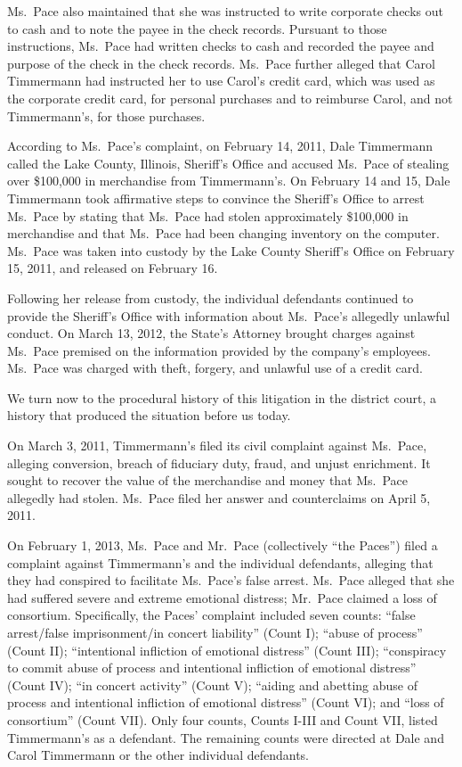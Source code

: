 \documentclass[11pt,letterpaper,twoside]{article}
\begin{document}
Ms.~Pace also maintained that she was instructed to write corporate
checks out to cash and to note the payee in the check records. Pursuant
to those instructions, Ms.~Pace had written checks to cash and recorded
the payee and purpose of the check in the check records. Ms.~Pace
further alleged that Carol Timmermann had instructed her to use Carol's
credit card, which was used as the corporate credit card, for personal
purchases and to reimburse Carol, and not Timmermann's, for those
purchases.

According to Ms.~Pace's complaint, on February 14, 2011, Dale Timmermann
called the Lake County, Illinois, Sheriff's Office and accused Ms.~Pace
of stealing over \$100,000 in merchandise from Timmermann's. On February
14 and 15, Dale Timmermann took affirmative steps to convince the
Sheriff's Office to arrest Ms.~Pace by stating that Ms.~Pace had stolen
approximately \$100,000 in merchandise and that Ms.~Pace had been
changing inventory on the computer. Ms.~Pace was taken into custody by
the Lake County Sheriff's Office on February 15, 2011, and released on
February 16.

Following her release from custody, the individual defendants continued
to provide the Sheriff's Office with information about Ms.~Pace's
allegedly unlawful conduct. On March 13, 2012, the State's Attorney
brought charges against Ms.~Pace premised on the information provided by
the company's employees. Ms.~Pace was charged with theft, forgery, and
unlawful use of a credit card.

We turn now to the procedural history of this litigation in the district
court, a history that produced the situation before us today.

On March 3, 2011, Timmermann's filed its civil complaint against
Ms.~Pace, alleging conversion, breach of fiduciary duty, fraud, and
unjust enrichment. It sought to recover the value of the merchandise and
money that Ms.~Pace allegedly had stolen. Ms.~Pace filed her answer and
counterclaims on April 5, 2011.

On February 1, 2013, Ms.~Pace and Mr.~Pace (collectively ``the Paces'')
filed a complaint against Timmermann's and the individual defendants,
alleging that they had conspired to facilitate Ms.~Pace's false arrest.
Ms.~Pace alleged that she had suffered severe and extreme emotional
distress; Mr.~Pace claimed a loss of consortium. Specifically, the
Paces' complaint included seven counts: ``false arrest/false
imprisonment/in concert liability'' (Count I); ``abuse of process''
(Count II); ``intentional infliction of emotional distress'' (Count
III); ``conspiracy to commit abuse of process and intentional infliction
of emotional distress'' (Count IV); ``in concert activity'' (Count V);
``aiding and abetting abuse of process and intentional infliction of
emotional distress'' (Count VI); and ``loss of consortium'' (Count VII).
Only four counts, Counts I-III and Count VII, listed Timmermann's as a
defendant. The remaining counts were directed at Dale and Carol
Timmermann or the other individual defendants.
\end{document}
